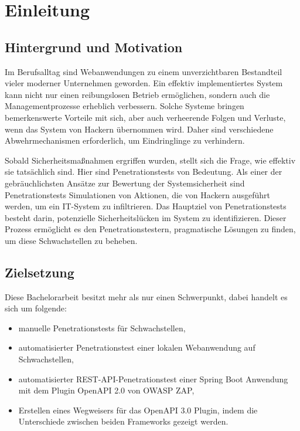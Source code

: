 \chapter{Einleitung}
\label{cha:Einleitung}

\section{Hintergrund und Motivation}

Im Berufsalltag sind Webanwendungen zu einem unverzichtbaren Bestandteil vieler moderner Unternehmen geworden. Ein effektiv implementiertes System kann nicht nur einen reibungslosen Betrieb ermöglichen, sondern auch die Managementprozesse erheblich verbessern. Solche Systeme bringen bemerkenswerte Vorteile mit sich, aber auch verheerende Folgen und Verluste, wenn das System von Hackern übernommen wird. Daher sind verschiedene Abwehrmechanismen erforderlich, um Eindringlinge zu verhindern.

Sobald Sicherheitsmaßnahmen ergriffen wurden, stellt sich die Frage, wie effektiv sie tatsächlich sind. Hier sind Penetrationstests von Bedeutung. Als einer der gebräuchlichsten Ansätze zur Bewertung der Systemsicherheit sind Penetrationstests Simulationen von Aktionen, die von Hackern ausgeführt werden, um ein IT-System zu infiltrieren. Das Hauptziel von Penetrationstests besteht darin, potenzielle Sicherheitslücken im System zu identifizieren. Dieser Prozess ermöglicht es den Penetrationstestern, pragmatische Lösungen zu finden, um diese Schwachstellen zu beheben.

\section{Zielsetzung}

Diese Bachelorarbeit besitzt mehr als nur einen Schwerpunkt, dabei handelt es sich um folgende:

\begin{itemize}
	\item manuelle Penetrationstests für Schwachstellen,
	\item automatisierter Penetrationstest einer lokalen Webanwendung auf Schwachstellen,
	\item automatisierter REST-API-Penetrationstest einer Spring Boot Anwendung mit dem Plugin OpenAPI 2.0 von OWASP ZAP,
	\item Erstellen eines Wegweisers für das OpenAPI 3.0 Plugin, indem die Unterschiede zwischen beiden Frameworks gezeigt werden.\\
\end{itemize}


